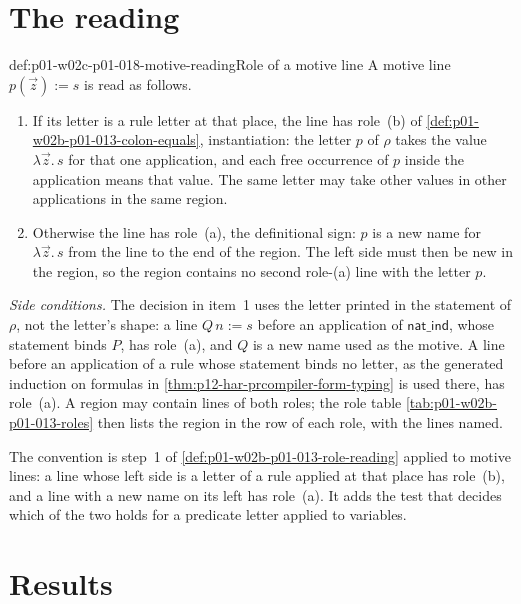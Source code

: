 \section{The reading}
\label{sec:p01-w02c-p01-018-reading}

\begin{hbconvention}{def:p01-w02c-p01-018-motive-reading}{Role of a motive line}
A motive line \(p(\vec z):=s\) is read as follows.
\begin{enumerate}
  \item If its letter is a rule letter at that place, the line has
  role~(b) of \cref{def:p01-w02b-p01-013-colon-equals}, instantiation: the
  letter \(p\) of \(\rho\) takes the value \(\lambda\vec z.\,s\) for that
  one application, and each free occurrence of \(p\) inside the
  application means that value.  The same letter may take other values in
  other applications in the same region.
  \item Otherwise the line has role~(a), the definitional sign: \(p\) is a
  new name for \(\lambda\vec z.\,s\) from the line to the end of the
  region.  The left side must then be new in the region, so the region
  contains no second role-(a) line with the letter \(p\).
\end{enumerate}
\emph{Side conditions.}  The decision in item~1 uses the letter printed in
the statement of \(\rho\), not the letter's shape: a line \(Q\,n:=s\)
before an application of \(\mathsf{nat\_ind}\), whose statement binds
\(P\), has role~(a), and \(Q\) is a new name used as the motive.  A line
before an application of a rule whose statement binds no letter, as the
generated induction on formulas in \cref{thm:p12-har-prcompiler-form-typing}
is used there, has role~(a).  A region may contain lines of both roles; the
role table \cref{tab:p01-w02b-p01-013-roles} then lists the region in the
row of each role, with the lines named.
\end{hbconvention}

The convention is step~1 of \cref{def:p01-w02b-p01-013-role-reading}
applied to motive lines: a line whose left side is a letter of a rule
applied at that place has role~(b), and a line with a new name on its left
has role~(a).  It adds the test that decides which of the two holds for a
predicate letter applied to variables.

\section{Results}
\label{sec:p01-w02c-p01-018-results}

